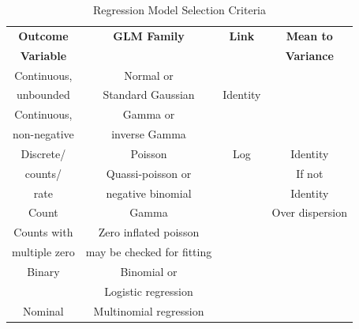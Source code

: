 \documentclass{beamer}
\begin{document}
\begin{frame}[plain]%
\begin{table}[h]
	\centering
	\begin{tabular}{cccc}
		\textbf{Outcome} & \textbf{GLM Family} & \textbf{Link} & \textbf{Mean to} \\
		\textbf{Variable} & & & \textbf{Variance} \\ 
		\hline %
		Continuous, & Normal or & \\ unbounded & Standard Gaussian & Identity &  \\  
		\hline
		Continuous, & Gamma or & \\ non-negative & inverse Gamma &  &  \\ \hline
		
		
		Discrete/ & Poisson & Log & Identity \\
		counts/ & Quassi-poisson or &  & If not \\
		rate & negative binomial & & Identity \\
		
		
		\hline
		
		Count & Gamma &  & Over dispersion \\ \hline
		Counts with & Zero inflated poisson & \\ multiple zero & may be checked 
		for fitting & & \\ \hline
		Binary & Binomial or & \\  & Logistic regression & & \\ \hline
		Nominal  & Multinomial regression & \\
		\hline
	\end{tabular} 
	\caption{Regression Model Selection Criteria}
\end{table}
\end{frame}
\end{document}
